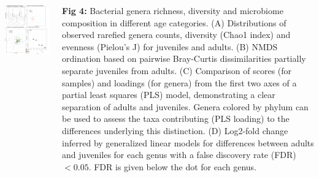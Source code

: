 \documentclass[30pt, a0paper, portrait, margin=0mm, innermargin=15mm,
               blockverticalspace=15mm, colspace=15mm, subcolspace=8mm]{tikzposter}
\begin{document}
\begin{columns}


 {

  \begin{minipage}{0.5\linewidth}                  
  \includegraphics[scale=0.6]{Figure3_man.png} 
  \end{minipage}
  \hfill
  \begin{minipage}{0.5\linewidth}
  
    \textbf{Fig 4:} Bacterial genera richness, diversity and
    microbiome composition in different age categories. (A)
    Distributions of observed rarefied genera counts, diversity (Chao1
    index) and evenness (Pielou's J) for juveniles and adults. (B)
    NMDS ordination based on pairwise Bray-Curtis dissimilarities
    partially separate juveniles from adults. (C) Comparison of scores
    (for samples) and loadings (for genera) from the first two axes of
    a partial least squares (PLS) model, demonstrating a clear
    separation of adults and juveniles. Genera colored by phylum can
    be used to assess the taxa contributing (PLS loading) to the
    differences underlying this distinction.  (D) Log2-fold change
    inferred by generalized linear models for differences between
    adults and juveniles for each genus with a false discovery rate
    (FDR) $< 0.05$.  FDR is given below the dot for each genus.


\end{minipage}}
\end{columns}
\end{document}
